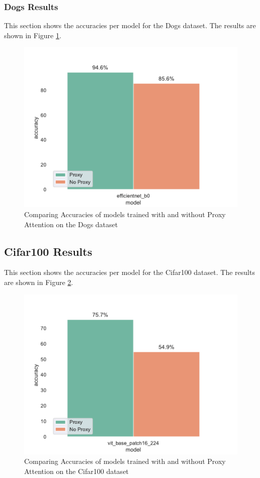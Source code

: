 \subsubsection{Dogs Results}
This section shows the accuracies per model for the Dogs dataset. The results are shown in Figure \ref{fig:dogs_results}. 
\begin{figure}[H]
    \centering
    \includegraphics[width=1\textwidth]{results/dogs_results.pdf}
    \caption{Comparing Accuracies of models trained with and without Proxy Attention on the Dogs dataset}
    \label{fig:dogs_results}
\end{figure}

\subsection{Cifar100 Results}
This section shows the accuracies per model for the Cifar100 dataset. The results are shown in Figure \ref{fig:cifar100_results}. 
\begin{figure}[H]
    \centering
    \includegraphics[width=1\textwidth]{results/cifar100_results.pdf}
    \caption{Comparing Accuracies of models trained with and without Proxy Attention on the Cifar100 dataset}
    \label{fig:cifar100_results}
\end{figure}

